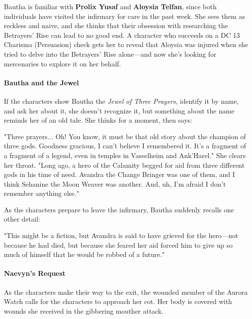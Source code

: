 \documentclass[letterpaper, 11pt, bg=full, twocolumn]{dndbook}
\begin{document}
Bautha is familiar with \textbf{Prolix Yusaf} and \textbf{Aloysia Telfan}, since both individuals have visited the infirmary for care in the past week. She sees them as reckless and naive, and she thinks that their obsession with researching the Betrayers' Rise can lead to no good end. A character who succeeds on a DC 13 Charisma (Persuasion) check gets her to reveal that Aloysia was injured when she tried to delve into the Betrayers' Rise alone---and now she's looking for mercenaries to explore it on her behalf.

\paragraph{Bautha and the Jewel}

If the characters show Bautha the \textit{Jewel of Three Prayers}, identify it by name, and ask her about it, she doesn't recognize it, but something about the name reminds her of an old tale. She thinks for a moment, then says:

\begin{DndReadAloud}
"Three prayers... Oh! You know, it must be that old story about the champion of three gods. Goodness gracious, I can't believe I remembered it. It's a fragment of a fragment of a legend, even in temples in Vasselheim and Ank'Harel." She clears her throat. "Long ago, a hero of the Calamity begged for aid from three different gods in his time of need. Avandra the Change Bringer was one of them, and I think Sehanine the Moon Weaver was another. And, uh, I'm afraid I don't remember anything else."
\end{DndReadAloud}

As the characters prepare to leave the infirmary, Bautha suddenly recalls one other detail:

\begin{DndReadAloud}
"This might be a fiction, but Avandra is said to have grieved for the hero---not because he had died, but because she feared her aid forced him to give up so much of himself that he would be robbed of a future."
\end{DndReadAloud}

\paragraph{Naevyn's Request}

As the characters make their way to the exit, the wounded member of the Aurora Watch calls for the characters to approach her cot. Her body is covered with wounds she received in the gibbering mouther attack.
\end{document}
